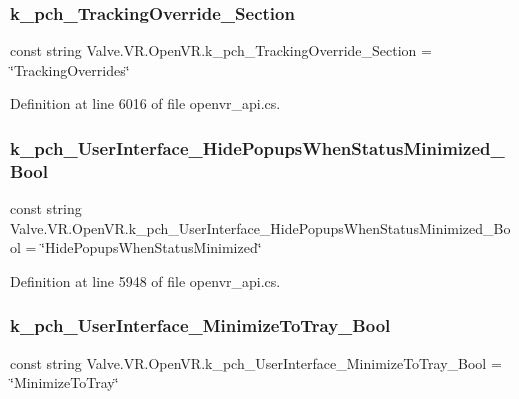 \subsubsection{\texorpdfstring{k\_pch\_TrackingOverride\_Section}{k\_pch\_TrackingOverride\_Section}}
{\footnotesize\ttfamily const string Valve.\+V\+R.\+Open\+V\+R.\+k\+\_\+pch\+\_\+\+Tracking\+Override\+\_\+\+Section = \char`\"{}Tracking\+Overrides\char`\"{}}



Definition at line 6016 of file openvr\+\_\+api.\+cs.

\mbox{\label{class_valve_1_1_v_r_1_1_open_v_r_a4d74fb37d27e1758cd2b409baa98fe17}} 
\subsubsection{\texorpdfstring{k\_pch\_UserInterface\_HidePopupsWhenStatusMinimized\_Bool}{k\_pch\_UserInterface\_HidePopupsWhenStatusMinimized\_Bool}}
{\footnotesize\ttfamily const string Valve.\+V\+R.\+Open\+V\+R.\+k\+\_\+pch\+\_\+\+User\+Interface\+\_\+\+Hide\+Popups\+When\+Status\+Minimized\+\_\+\+Bool = \char`\"{}Hide\+Popups\+When\+Status\+Minimized\char`\"{}}



Definition at line 5948 of file openvr\+\_\+api.\+cs.

\mbox{\label{class_valve_1_1_v_r_1_1_open_v_r_ab45226927c0b6d662b1901345a12eb3f}} 
\subsubsection{\texorpdfstring{k\_pch\_UserInterface\_MinimizeToTray\_Bool}{k\_pch\_UserInterface\_MinimizeToTray\_Bool}}
{\footnotesize\ttfamily const string Valve.\+V\+R.\+Open\+V\+R.\+k\+\_\+pch\+\_\+\+User\+Interface\+\_\+\+Minimize\+To\+Tray\+\_\+\+Bool = \char`\"{}Minimize\+To\+Tray\char`\"{}}



